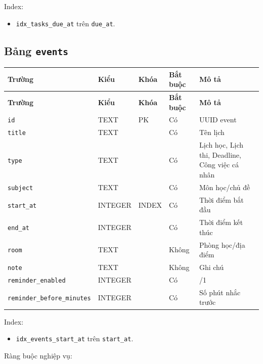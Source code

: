 \documentclass[12pt,a4paper]{report}
\begin{document}
Index:

\begin{itemize}
\item \texttt{idx\_tasks\_due\_at} trên \texttt{due\_at}.
\end{itemize}

\subsection{Bảng \texttt{events}}

\begin{longtable}{|>{\raggedright\arraybackslash}p{}|>{\raggedright\arraybackslash}p{}|>{\raggedright\arraybackslash}p{}|>{\raggedright\arraybackslash}p{}|>{\raggedright\arraybackslash}p{}|}
\hline
\textbf{Trường} & \textbf{Kiểu} & \textbf{Khóa} & \textbf{Bắt buộc} & \textbf{Mô tả} \\ \hline
\endfirsthead
\hline
\textbf{Trường} & \textbf{Kiểu} & \textbf{Khóa} & \textbf{Bắt buộc} & \textbf{Mô tả} \\ \hline
\endhead
\texttt{id} & TEXT & PK & Có & UUID event \\ \hline
\texttt{title} & TEXT &  & Có & Tên lịch \\ \hline
\texttt{type} & TEXT &  & Có & Lịch học, Lịch thi, Deadline, Công việc cá nhân \\ \hline
\texttt{subject} & TEXT &  & Có & Môn học/chủ đề \\ \hline
\texttt{start\_at} & INTEGER & INDEX & Có & Thời điểm bắt đầu \\ \hline
\texttt{end\_at} & INTEGER &  & Có & Thời điểm kết thúc \\ \hline
\texttt{room} & TEXT &  & Không & Phòng học/địa điểm \\ \hline
\texttt{note} & TEXT &  & Không & Ghi chú \\ \hline
\texttt{reminder\_enabled} & INTEGER &  & Có & 0/1 \\ \hline
\texttt{reminder\_before\_minutes} & INTEGER &  & Có & Số phút nhắc trước \\ \hline
\end{longtable}

Index:

\begin{itemize}
\item \texttt{idx\_events\_start\_at} trên \texttt{start\_at}.
\end{itemize}

Ràng buộc nghiệp vụ:
\end{document}
